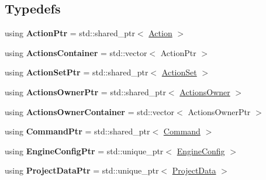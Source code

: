 \subsection*{Typedefs}
\begin{DoxyCompactItemize}
\item 
\hypertarget{namespaceDCEngine_afb966e132a34bf8f735f7382592117c1}{using {\bfseries Action\-Ptr} = std\-::shared\-\_\-ptr$<$ \hyperlink{classDCEngine_1_1Action}{Action} $>$}\label{namespaceDCEngine_afb966e132a34bf8f735f7382592117c1}

\item 
\hypertarget{namespaceDCEngine_a185d16db9db10ab7dcc13f235b6084b6}{using {\bfseries Actions\-Container} = std\-::vector$<$ Action\-Ptr $>$}\label{namespaceDCEngine_a185d16db9db10ab7dcc13f235b6084b6}

\item 
\hypertarget{namespaceDCEngine_a0d17ef7ea7367db86a884ce6a80bd3d4}{using {\bfseries Action\-Set\-Ptr} = std\-::shared\-\_\-ptr$<$ \hyperlink{classDCEngine_1_1ActionSet}{Action\-Set} $>$}\label{namespaceDCEngine_a0d17ef7ea7367db86a884ce6a80bd3d4}

\item 
\hypertarget{namespaceDCEngine_a844aaea0b902e67d8a52ee87c6fd46af}{using {\bfseries Actions\-Owner\-Ptr} = std\-::shared\-\_\-ptr$<$ \hyperlink{classDCEngine_1_1ActionsOwner}{Actions\-Owner} $>$}\label{namespaceDCEngine_a844aaea0b902e67d8a52ee87c6fd46af}

\item 
\hypertarget{namespaceDCEngine_ac039be23ffd8c568541fa61a2f0a615e}{using {\bfseries Actions\-Owner\-Container} = std\-::vector$<$ Actions\-Owner\-Ptr $>$}\label{namespaceDCEngine_ac039be23ffd8c568541fa61a2f0a615e}

\item 
\hypertarget{namespaceDCEngine_a0b369931802e2018ee1f083dd2ea426c}{using {\bfseries Command\-Ptr} = std\-::shared\-\_\-ptr$<$ \hyperlink{classDCEngine_1_1Command}{Command} $>$}\label{namespaceDCEngine_a0b369931802e2018ee1f083dd2ea426c}

\item 
\hypertarget{namespaceDCEngine_ac11900ad7484b1dc5cf052ddc3919264}{using {\bfseries Engine\-Config\-Ptr} = std\-::unique\-\_\-ptr$<$ \hyperlink{structDCEngine_1_1EngineConfig}{Engine\-Config} $>$}\label{namespaceDCEngine_ac11900ad7484b1dc5cf052ddc3919264}

\item 
\hypertarget{namespaceDCEngine_a0258cc65a1a516681ac2d51d95ae886e}{using {\bfseries Project\-Data\-Ptr} = std\-::unique\-\_\-ptr$<$ \hyperlink{structDCEngine_1_1ProjectData}{Project\-Data} $>$}\label{namespaceDCEngine_a0258cc65a1a516681ac2d51d95ae886e}


\end{DoxyCompactItemize}
